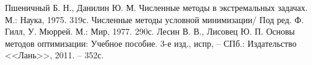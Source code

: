 \documentclass{article}
\begin{document}
\begin{thebibliography}{9}
 Пшеничный Б. Н., Данилин Ю. М. Численные методы в экстремальных задачах. М.: Наука, 1975. 319с.
 Численные методы условной минимизации/ Под ред. Ф. Гилл, У. Мюррей. М.: Мир, 1977. 290с.
 Лесин В. В., Лисовец Ю. П. Основы методов оптимизации: Учебное пособие. 3-е изд., испр, -- СПб.: Издательство <<Лань>>, 2011. -- 352с.
\end{thebibliography}
\end{document}
